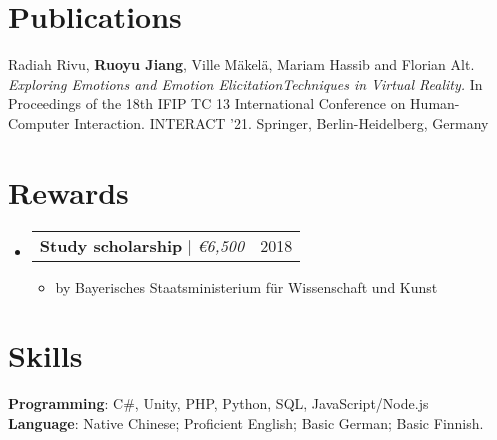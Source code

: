 \documentclass[letterpaper,11pt]{article}
\makeatletter
\newcommand{\resumeItem}[1]{
  \item\small{
    {#1 \vspace{-2pt}}
  }
}
\newcommand{\resumeProjectHeading}[2]{
    \item
    \begin{tabular*}{0.97\textwidth}{l@{\extracolsep{\fill}}r}
      \small#1 & #2 \\
    \end{tabular*}\vspace{-7pt}
}
\newcommand{\resumeSubHeadingListStart}{\begin{itemize}[leftmargin=0.15in, label={}]}
\newcommand{\resumeSubHeadingListEnd}{\end{itemize}}
\newcommand{\resumeItemListStart}{\begin{itemize}}
\newcommand{\resumeItemListEnd}{\end{itemize}\vspace{-5pt}}
\makeatother
\begin{document}
  
\section{Publications}
        {Radiah Rivu, \textbf{Ruoyu Jiang}, Ville Mäkelä, Mariam Hassib and Florian Alt. \textit{Exploring Emotions and Emotion ElicitationTechniques in Virtual Reality.}} In Proceedings of the 18th IFIP TC 13 International Conference on Human-Computer Interaction. INTERACT '21. Springer, Berlin-Heidelberg, Germany
  
  
\section{Rewards}
    \resumeSubHeadingListStart
      \resumeProjectHeading
          {\textbf{Study scholarship} $|$ \emph{\euro 6,500}}{2018}
          \resumeItemListStart
            \resumeItem{by Bayerisches Staatsministerium für Wissenschaft und Kunst}
          \resumeItemListEnd
    \resumeSubHeadingListEnd

%
\section{Skills}
 \begin{itemize}[leftmargin=0.15in, label={}]
    \small{\item{
     \textbf{Programming}{: C\#, Unity, PHP, Python, SQL, JavaScript/Node.js } \\
     \textbf{Language}{: Native Chinese; Proficient English; Basic German; Basic Finnish.}
    }}
 \end{itemize}

\end{document}
